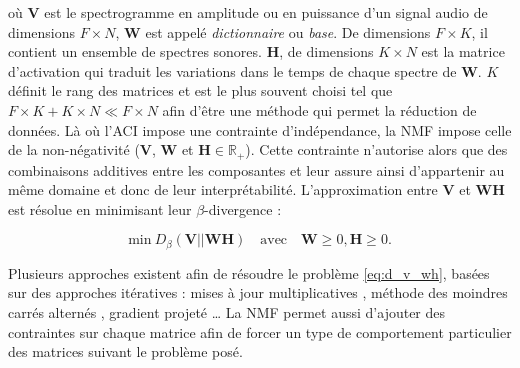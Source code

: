 où $\mathbf{V}$ est le spectrogramme en amplitude ou en puissance d'un signal audio de dimensions $F \times N$, $\mathbf{W}$ est appelé \textit{dictionnaire} ou \textit{base}. De dimensions $F \times K$, il contient un ensemble de spectres sonores. $\mathbf{H}$, de dimensions $K \times N$ est la matrice d'activation qui traduit les variations dans le temps de chaque spectre de $\mathbf{W}$.  $K$ définit le rang des matrices et est le plus souvent choisi tel que $F\times K + K \times N \ll F \times N$ afin d'être une méthode qui permet la réduction de données.
Là où l'ACI impose une contrainte d'indépendance, la NMF impose celle de la \og non-négativité \fg{} ($\mathbf{V}$, $\mathbf{W}$ et $\mathbf{H} \in \mathbb{R}_+$). Cette contrainte n'autorise alors que des combinaisons additives entre les composantes et leur assure ainsi d'appartenir au même domaine et donc de leur interprétabilité. 
L'approximation entre $\mathbf{V}$ et $\mathbf{WH}$ est résolue en minimisant leur $\beta$-divergence :

\begin{equation}\label{eq:d_v_wh}
\text{min}~D_{\beta}\left(\textbf{V} \vert\vert \textbf{WH}\right) \quad \text{avec} \quad \mathbf{W} \geq 0, \mathbf{H} \geq 0.
\end{equation}

Plusieurs approches existent afin de résoudre le problème \ref{eq:d_v_wh}, basées sur des approches itératives : mises à jour multiplicatives \cite{lee_algorithms_2000}, méthode des moindres carrés alternés \cite{cichocki_regularized_2007}, gradient projeté \cite{lin_projected_2007} \dots{} La NMF permet aussi d'ajouter des contraintes sur chaque matrice \cite{virtanen_monaural_2007, bertin2010enforcing} afin de forcer un type de comportement particulier des matrices suivant le problème posé.

